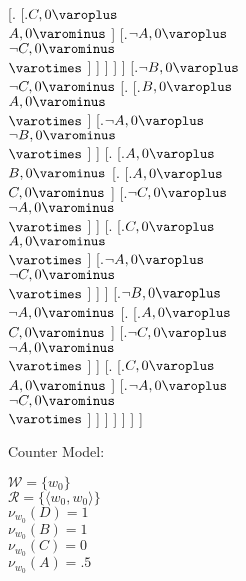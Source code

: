 [.{} [.{$C, 0\varoplus $ \\ $A, 0\varominus $}  ] 
[.{$\neg A, 0\varoplus $ \\ $\neg C, 0\varominus $ \\ $ \varotimes  $}  ]  ]  ]  ]  ] 
[.{$\neg B, 0\varoplus $ \\ $\neg C, 0\varominus $} [.{} [.{$B, 0\varoplus $ \\ $A, 0\varominus $ \\ $ \varotimes  $}  ] 
[.{$\neg A, 0\varoplus $ \\ $\neg B, 0\varominus $ \\ $ \varotimes  $}  ]  ] 
[.{} [.{$A, 0\varoplus $ \\ $B, 0\varominus $} [.{} [.{$A, 0\varoplus $ \\ $C, 0\varominus $}  ] 
[.{$\neg C, 0\varoplus $ \\ $\neg A, 0\varominus $ \\ $ \varotimes  $}  ]  ] 
[.{} [.{$C, 0\varoplus $ \\ $A, 0\varominus $ \\ $ \varotimes  $}  ] 
[.{$\neg A, 0\varoplus $ \\ $\neg C, 0\varominus $ \\ $ \varotimes  $}  ]  ]  ] 
[.{$\neg B, 0\varoplus $ \\ $\neg A, 0\varominus $} [.{} [.{$A, 0\varoplus $ \\ $C, 0\varominus $}  ] 
[.{$\neg C, 0\varoplus $ \\ $\neg A, 0\varominus $ \\ $ \varotimes  $}  ]  ] 
[.{} [.{$C, 0\varoplus $ \\ $A, 0\varominus $}  ] 
[.{$\neg A, 0\varoplus $ \\ $\neg C, 0\varominus $ \\ $ \varotimes  $}  ]  ]  ]  ]  ]  ]  ]

\bigskip

Counter Model: 

\bigskip
\noindent $\mathcal{W} = \{ w_0\} $\\
$\mathcal{R} = \{ \langle w_0,w_0 \rangle \} $\\
$ \mathcal{\nu}_{w_0}(D)=1 $ \\
$ \mathcal{\nu}_{w_0}(B)=1 $ \\
$ \mathcal{\nu}_{w_0}(C)=0 $ \\
$ \mathcal{\nu}_{w_0}(A)=.5 $ \\
\bigskip

